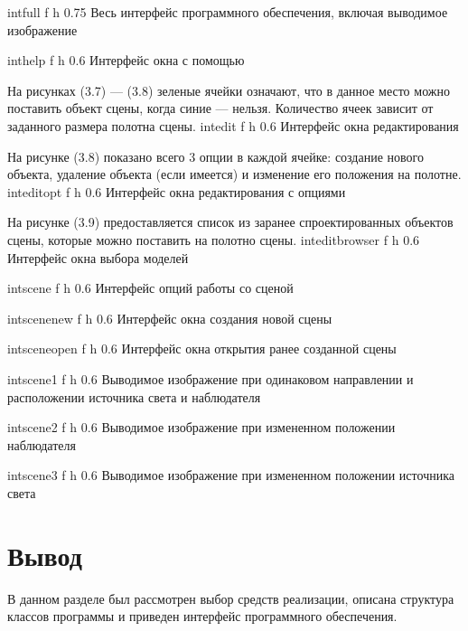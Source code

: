{intfull}
{f}
{h}
{0.75\textwidth}
{Весь интерфейс программного обеспечения, включая выводимое изображение}

{inthelp}
{f}
{h}
{0.6\textwidth}
{Интерфейс окна с помощью}


На рисунках (3.7) --- (3.8) зеленые ячейки означают, что в данное место
можно поставить объект сцены, когда синие --- нельзя.
Количество ячеек зависит от заданного размера полотна сцены.
{intedit}
{f}
{h}
{0.6\textwidth}
{Интерфейс окна редактирования}

На рисунке (3.8) показано всего 3 опции в каждой ячейке:
создание нового объекта, удаление объекта (если имеется)
и изменение его положения на полотне.
{inteditopt}
{f}
{h}
{0.6\textwidth}
{Интерфейс окна редактирования с опциями}


На рисунке (3.9) предоставляется список из заранее спроектированных объектов сцены, которые
можно поставить на полотно сцены.
{inteditbrowser}
{f}
{h}
{0.6\textwidth}
{Интерфейс окна выбора моделей}

{intscene}
{f}
{h}
{0.6\textwidth}
{Интерфейс опций работы со сценой}



{intscenenew}
{f}
{h}
{0.6\textwidth}
{Интерфейс окна создания новой сцены}

{intsceneopen}
{f}
{h}
{0.6\textwidth}
{Интерфейс окна открытия ранее созданной сцены}


{intscene1}
{f}
{h}
{0.6\textwidth}
{Выводимое изображение при одинаковом направлении и расположении источника света и наблюдателя}

{intscene2}
{f}
{h}
{0.6\textwidth}
{Выводимое изображение при измененном положении наблюдателя}

{intscene3}
{f}
{h}
{0.6\textwidth}
{Выводимое изображение при измененном положении источника света}

\clearpage

\section{Вывод}
В данном разделе был рассмотрен выбор средств реализации, описана структура
классов программы и приведен интерфейс программного обеспечения.
